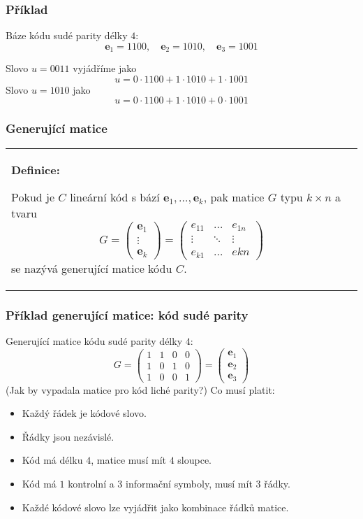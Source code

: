 \documentclass{beamer}
\newenvironment{definice}
{
    \begin{center}
    \begin{tabular}{p{9cm}}
    \textbf{Definice:}
}
{
    \end{tabular}
    \end{center}
}
\newcommand{\e}{\textbf{e}}
\newenvironment{itemizey}%
  {\large \begin{itemize}%
    \setlength{\itemsep}{6pt}%
    \setlength{\parskip}{6pt}}%
  {\end{itemize}}
\begin{document}
\begin{frame}[t,fragile]\frametitle{Příklad} 
    Báze kódu sudé parity délky $4$:
    $$
\e_1=1100,\quad\e_2=1010,\quad\e_3=1001
    $$

    Slovo $u=0011$ vyjádříme jako
    $$
u=0\cdot1100+1\cdot1010+1\cdot1001
    $$
    Slovo $u=1010$ jako
    $$
u=0\cdot1100+1\cdot1010+0\cdot1001
    $$
\end{frame}


\begin{frame}[t,fragile]\frametitle{Generující matice} 
    \begin{definice}
        \item Pokud je $C$ lineární kód s bází $\e_1,\dots,\e_k$, pak matice $G$ typu $k\times n$ a tvaru
        $$
        G=
        \begin{pmatrix}
        \e_1\\
        \vdots\\
        \e_k
        \end{pmatrix}
        =
        \begin{pmatrix}
        e_{11}&\dots&e_{1n}\\
        \vdots&\ddots&\vdots\\
        e_{k1}&\dots&e{kn}
        \end{pmatrix}
        $$
        se nazývá generující matice kódu $C$.
    \end{definice}
\end{frame}


\begin{frame}[t,fragile]\frametitle{Příklad generující matice: kód sudé parity} 
Generující matice kódu sudé parity délky $4$:
$$
G=
\begin{pmatrix}
1&1&0&0\\
1&0&1&0\\
1&0&0&1
\end{pmatrix}
=
\begin{pmatrix}
\e_1\\
\e_2\\
\e_3
\end{pmatrix}
$$
(Jak by vypadala matice pro kód liché parity?) Co musí platit:

\begin{itemizey}
    \item Každý řádek je kódové slovo.
    \item Řádky jsou nezávislé. 
    \item Kód má délku $4$, matice musí mít $4$ sloupce.
    \item Kód má $1$ kontrolní a 3 informační symboly, musí mít 3 řádky. 
    \item Každé kódové slovo lze vyjádřit jako kombinace řádků matice.
\end{itemizey}
\end{frame}
\end{document}
